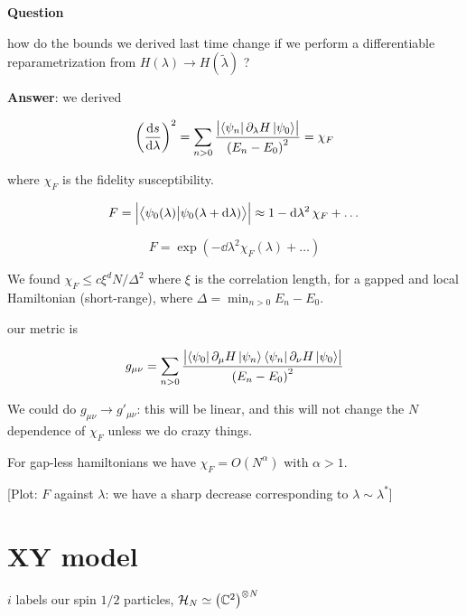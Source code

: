 \documentclass[main_zanardi.tex]{subfiles}
\begin{document}
\begin{bluebox}
  \textbf{Question}

  how do the bounds we derived last time change if we perform a differentiable reparametrization from \(H(\lambda) \rightarrow H(\widetilde{\lambda} )\) ?
\end{bluebox}

\textbf{Answer}: we derived

\begin{equation}
    \qty(\dv{s}{\lambda} )^2
    = \sum _{n>0}  \frac{\abs{\bra{\psi_n} \partial_ \lambda H \ket{\psi_0}  } }{\qty(E_n - E_0)^2}
    = \chi_F
\end{equation}

where \( \chi_F \) is the fidelity susceptibility.

\begin{equation}
    F = \abs{\braket{\psi_0 (\lambda)}{\psi_0(\lambda + \dd{\lambda} )}}
    \approx 1 - \dd{\lambda^2} \chi_F + \dots
\end{equation}

\begin{equation}
    F = \exp(- \dd{\lambda^2} \chi_F (\lambda) + \dots )
\end{equation}

We found \(\chi_F \leq c \xi^d N / \Delta^2\) where \(\xi\) is the correlation length, for a gapped and local Hamiltonian (short-range), where \(\Delta = \min_{n>0} E_n - E_0\).

our metric is

\begin{equation}
    g _{\mu \nu} = \sum _{n>0}
    \frac{\abs{\bra{\psi_0} \partial_ \mu H \ket{\psi_n} \bra{\psi_n} \partial_ \nu  H \ket{\psi_0} } }{\qty(E_n - E_0)^2}
\end{equation}

We could  do \(g_{\mu \nu} \rightarrow g' _{\mu \nu}\): this will be linear, and this will not change the \(N\) dependence of \(\chi_F\) unless we do crazy things.

For gap-less hamiltonians we have \(\chi_F = O(N^\alpha) \) with \(\alpha>1\).

[Plot: \(F\) against \(\lambda\): we have a sharp decrease corresponding to \(\lambda \sim \lambda^*\)]

\section{XY model}

\(i\) labels our spin \(1/2\) particles,  \(\mathcal{H}_N \simeq \qty(\mathbb{C}^2)^{\otimes N} \)
\end{document}
